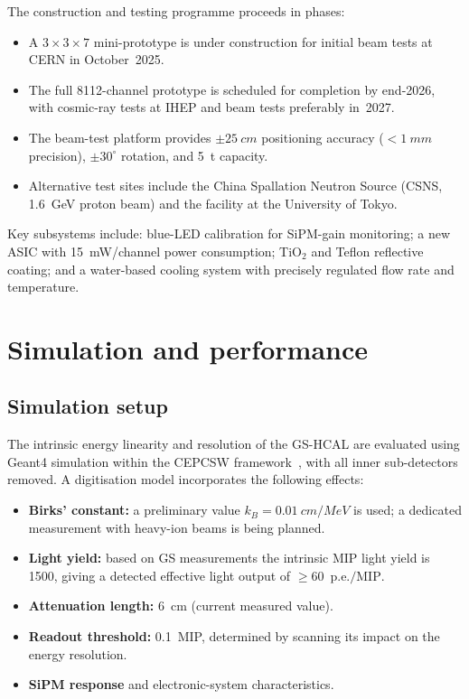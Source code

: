 \documentclass[preprint,12pt,times]{elsarticle}
\newcommand{\peMIP}{\ensuremath{\text{p.e.}/\text{MIP}}\xspace}
\begin{document}
The construction and testing programme proceeds in phases:
\begin{itemize}
\item A $3\times3\times7$ mini-prototype is under construction for
  initial beam tests at CERN in October~2025.
\item The full 8112-channel prototype is scheduled for completion by
  end-2026, with cosmic-ray tests at IHEP and beam tests preferably
  in~2027.
\item The beam-test platform provides $\pm\SI{25}{cm}$ positioning
  accuracy ($<\SI{1}{mm}$ precision), $\pm30^{\circ}$ rotation, and
  \SI{5}{t} capacity.
\item Alternative test sites include the China Spallation Neutron
  Source (CSNS, \SI{1.6}{GeV} proton beam) and the facility at the
  University of Tokyo.
\end{itemize}

Key subsystems include: blue-LED calibration for SiPM-gain monitoring;
a new ASIC with \SI{15}{mW/channel} power consumption; TiO$_{2}$ and
Teflon reflective coating; and a water-based cooling system with
precisely regulated flow rate and temperature.

\section{Simulation and performance}
\label{sec:simperf}

\subsection{Simulation setup}
\label{subsec:simsetup}

The intrinsic energy linearity and resolution of the GS-HCAL are
evaluated using Geant4 simulation within the CEPCSW
framework~\cite{CEPCStudyGroup:2018ghi}, with all inner sub-detectors
removed.
A digitisation model incorporates the following effects:
\begin{itemize}
\item \textbf{Birks' constant:} a preliminary value
  $k_{B}=\SI{0.01}{cm/MeV}$ is used; a dedicated measurement with
  heavy-ion beams is being planned.
\item \textbf{Light yield:} based on GS measurements the intrinsic MIP
  light yield is \SI{1500}{\phMeV}, giving a detected effective light
  output of $\geq60$~\peMIP.
\item \textbf{Attenuation length:} \SI{6}{cm} (current measured value).
\item \textbf{Readout threshold:} 0.1~MIP, determined by scanning its
  impact on the energy resolution.
\item \textbf{SiPM response} and electronic-system characteristics.
\end{itemize}
\end{document}
